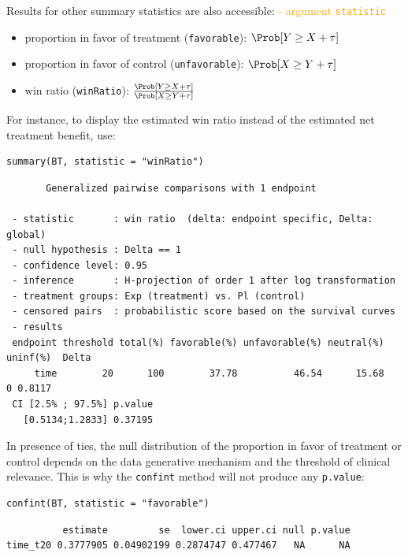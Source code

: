 \documentclass[12pt]{article}
\newcommand\Warning[1][3ex]{%
\renewcommand\stacktype{L}%
\scaleto{\stackon[1.3pt]{\color{red}$\triangle$}{\tiny\bfseries !}}{#1}%
\xspace
}
\begin{document}
Results for other summary statistics are also accessible: \hfill \textcolor{orange}{- argument \texttt{statistic}}
\begin{itemize}
\item proportion in favor of treatment (\texttt{favorable}): \(\Prob[Y\geq X + \tau]\)
\item proportion in favor of control (\texttt{unfavorable}): \(\Prob[X\geq Y + \tau]\)
\item win ratio (\texttt{winRatio}): \(\frac{\Prob[Y\geq X + \tau]}{\Prob[X\geq Y + \tau]}\)
\end{itemize}

\noindent For instance, to display the estimated win ratio instead of
the estimated net treatment benefit, use:
\lstset{language=r,label= ,caption= ,captionpos=b,numbers=none}
\begin{lstlisting}
summary(BT, statistic = "winRatio")
\end{lstlisting}

\begin{verbatim}
       Generalized pairwise comparisons with 1 endpoint

 - statistic       : win ratio  (delta: endpoint specific, Delta: global) 
 - null hypothesis : Delta == 1 
 - confidence level: 0.95 
 - inference       : H-projection of order 1 after log transformation 
 - treatment groups: Exp (treatment) vs. Pl (control) 
 - censored pairs  : probabilistic score based on the survival curves
 - results
 endpoint threshold total(%) favorable(%) unfavorable(%) neutral(%) uninf(%)  Delta
     time        20      100        37.78          46.54      15.68        0 0.8117
 CI [2.5% ; 97.5%] p.value 
   [0.5134;1.2833] 0.37195
\end{verbatim}

\Warning In presence of ties, the null distribution of the proportion
in favor of treatment or control depends on the data generative
mechanism and the threshold of clinical relevance. This is why the
\texttt{confint} method will not produce any \texttt{p.value}:
\lstset{language=r,label= ,caption= ,captionpos=b,numbers=none}
\begin{lstlisting}
confint(BT, statistic = "favorable")
\end{lstlisting}

\begin{verbatim}
          estimate         se  lower.ci upper.ci null p.value
time_t20 0.3777905 0.04902199 0.2874747 0.477467   NA      NA
\end{verbatim}
\end{document}
